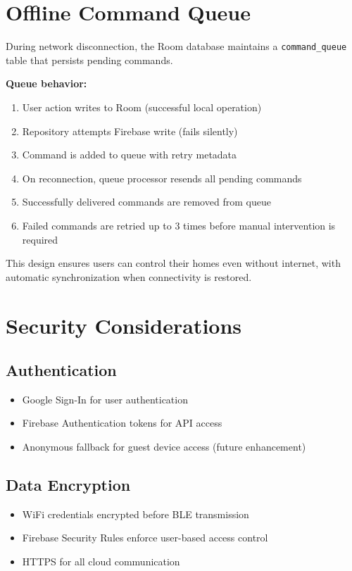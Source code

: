 \section{Offline Command Queue}

During network disconnection, the Room database maintains a \texttt{command\_queue} table that persists pending commands.

\textbf{Queue behavior:}

\begin{enumerate}
    \item User action writes to Room (successful local operation)
    \item Repository attempts Firebase write (fails silently)
    \item Command is added to queue with retry metadata
    \item On reconnection, queue processor resends all pending commands
    \item Successfully delivered commands are removed from queue
    \item Failed commands are retried up to 3 times before manual intervention is required
\end{enumerate}

This design ensures users can control their homes even without internet, with automatic synchronization when connectivity is restored.

\section{Security Considerations}

\subsection{Authentication}

\begin{itemize}
    \item Google Sign-In for user authentication
    \item Firebase Authentication tokens for API access
    \item Anonymous fallback for guest device access (future enhancement)
\end{itemize}

\subsection{Data Encryption}

\begin{itemize}
    \item WiFi credentials encrypted before BLE transmission
    \item Firebase Security Rules enforce user-based access control
    \item HTTPS for all cloud communication
\end{itemize}

